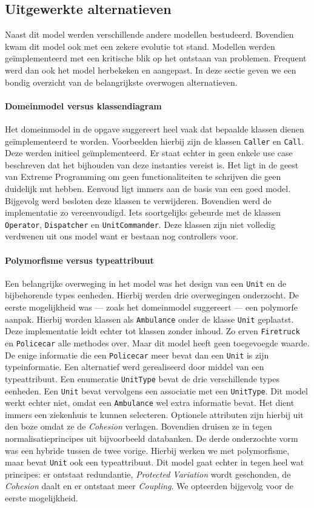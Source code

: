 \subsection{Uitgewerkte alternatieven}
Naast dit model werden verschillende andere modellen bestudeerd. Bovendien kwam dit model ook met een zekere evolutie tot stand. Modellen werden ge\"implementeerd met een kritische blik op het ontstaan van problemen. Frequent werd dan ook het model herbekeken en aangepast. In deze sectie geven we een bondig overzicht van de belangrijkste overwogen alternatieven.
\paragraph{Domeinmodel versus klassendiagram}
Het domeinmodel in de opgave suggereert heel vaak dat bepaalde klassen dienen ge\"implementeerd te worden. Voorbeelden hierbij zijn de klassen \texttt{Caller} en \texttt{Call}. Deze werden initieel ge\"implementeerd. Er staat echter in geen enkele use case beschreven dat het bijhouden van deze instanties vereist is. Het ligt in de geest van Extreme Programming om geen functionaliteiten te schrijven die geen duidelijk nut hebben. Eenvoud ligt immers aan de basis van een goed model. Bijgevolg werd besloten deze klassen te verwijderen. Bovendien werd de implementatie zo vereenvoudigd. Iets soortgelijks gebeurde met de klassen \texttt{Operator}, \texttt{Dispatcher} en \texttt{UnitCommander}. Deze klassen zijn niet volledig verdwenen uit ons model want er bestaan nog controllers voor.
\paragraph{Polymorfisme versus typeattribuut}
Een belangrijke overweging in het model was het design van een \texttt{Unit} en de bijbehorende types eenheden. Hierbij werden drie overwegingen onderzocht. De eerste mogelijkheid was --- zoals het domeinmodel suggereert --- een polymorfe aanpak. Hierbij worden klassen als \texttt{Ambulance} onder de klasse \texttt{Unit} geplaatst. Deze implementatie leidt echter tot klassen zonder inhoud. Zo erven \texttt{Firetruck} en \texttt{Policecar} alle methodes over. Maar dit model heeft geen toegevoegde waarde. De enige informatie die een \texttt{Policecar} meer bevat dan een \texttt{Unit} is zijn typeinformatie. Een alternatief werd gerealiseerd door middel van een typeattribuut. Een enumeratie \texttt{UnitType} bevat de drie verschillende types eenheden. Een \texttt{Unit} bevat vervolgens een associatie met een \texttt{UnitType}. Dit model werkt echter niet, omdat een \texttt{Ambulance} wel extra informatie bevat. Het dient immers een ziekenhuis te kunnen selecteren. Optionele attributen zijn hierbij uit den boze omdat ze de \textit{Cohesion} verlagen. Bovendien druisen ze in tegen normalisatieprincipes uit bijvoorbeeld databanken. De derde onderzochte vorm was een hybride tussen de twee vorige. Hierbij werken we met polymorfisme, maar bevat \texttt{Unit} ook een typeattribuut. Dit model gaat echter in tegen heel wat principes: er ontstaat redundantie, \textit{Protected Variation} wordt geschonden, de \textit{Cohesion} daalt en er ontstaat meer \textit{Coupling}. We opteerden bijgevolg voor de eerste mogelijkheid.
